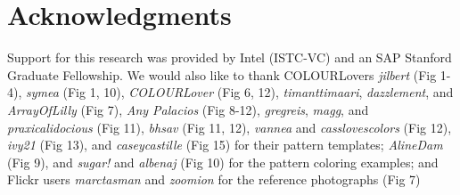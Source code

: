 \section*{Acknowledgments}

Support for this research was provided by Intel (ISTC-VC) and an SAP Stanford Graduate Fellowship.
We would also like to thank COLOURLovers \textit{jilbert} (Fig 1-4), \textit{symea} (Fig 1, 10), \textit{COLOURLover} (Fig 6, 12), \textit{timanttimaari}, \textit{dazzlement}, and \textit{ArrayOfLilly} (Fig 7), \textit{Any Palacios} (Fig 8-12), \textit{gregreis}, \textit{magg}, and \textit{praxicalidocious} (Fig 11), \textit{bhsav} (Fig 11, 12), \textit{vannea} and \textit{casslovescolors} (Fig 12), \textit{ivy21} (Fig 13), and \textit{caseycastille} (Fig 15) for their pattern templates; \textit{AlineDam} (Fig 9), and \textit{sugar!} and \textit{albenaj} (Fig 10) for the pattern coloring examples; and Flickr users \textit{marctasman} and \textit{zoomion} for the reference photographs (Fig 7)       
